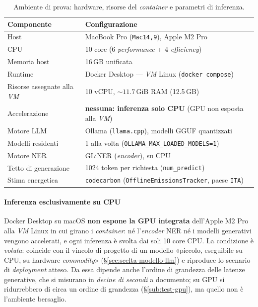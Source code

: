 \begin{table}
	\centering
	\caption{Ambiente di prova: hardware, risorse del \textit{container} e parametri di inferenza.}
	\label{tab:test-ambiente}
	\small
	\begin{tabular}{|l|l|}
		\hline
		\textbf{Componente}                & \textbf{Configurazione}                                                    \\
		\hline
		Host                               & MacBook Pro (\texttt{Mac14,9}), Apple M2 Pro                               \\
		\hline
		CPU                                & 10 core (6 \textit{performance} + 4 \textit{efficiency})                   \\
		\hline
		Memoria host                       & 16\,GB unificata                                                           \\
		\hline
		Runtime                            & Docker Desktop --- \textit{VM} Linux (\texttt{docker compose})             \\
		\hline
		Risorse assegnate alla \textit{VM} & 10 vCPU, ${\sim}11.7$\,GiB RAM (12.5\,GB)                                  \\
		\hline
		Accelerazione                      & \textbf{nessuna: inferenza solo CPU} (GPU non esposta alla \textit{VM})    \\
		\hline
		Motore LLM                         & Ollama (\texttt{llama.cpp}), modelli GGUF quantizzati                      \\
		\hline
		Modelli residenti                  & 1 alla volta (\texttt{OLLAMA\_MAX\_LOADED\_MODELS=1})                      \\
		\hline
		Motore NER                         & GLiNER (\textit{encoder}), su CPU                                          \\
		\hline
		Tetto di generazione               & 1024 token per richiesta (\texttt{num\_predict})                           \\
		\hline
		Stima energetica                   & \texttt{codecarbon} (\texttt{OfflineEmissionsTracker}, paese \texttt{ITA}) \\
		\hline
	\end{tabular}
\end{table}

\paragraph*{Inferenza esclusivamente su CPU} Docker Desktop su macOS \textbf{non espone la GPU integrata} dell'Apple M2 Pro alla \textit{VM} Linux in cui girano i \textit{container}: né l'\textit{encoder} NER né i modelli generativi vengono accelerati, e ogni inferenza è svolta dai soli 10 core CPU. La condizione è \emph{voluta}: coincide con il vincolo di progetto di un modello «piccolo, eseguibile su CPU, su hardware \textit{commodity}» (§\ref{sec:scelta-modello-llm}) e riproduce lo scenario di \textit{deployment} atteso. Da essa dipende anche l'ordine di grandezza delle latenze generative, che si misurano in \emph{decine di secondi} a documento; su GPU si ridurrebbero di circa un ordine di grandezza (§\ref{sub:test-gpu}), ma quello non è l'ambiente bersaglio.

